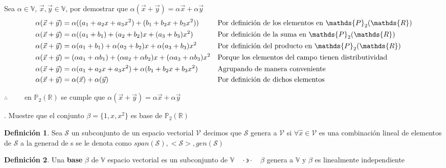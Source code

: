 \documentclass[letterpaper]{article}
\newcommand{\V}{\mathds{V}}
\newcommand{\tq}{ \quad \cdot  \backepsilon \cdot \quad }
\newcommand{\Po}{\mathds{P}_2(\mathds{R})}
\renewcommand{\*}{\cdot}
\theoremstyle{definition}
\newtheorem{definition}{Definición}
\begin{document}
Sea $ \alpha \in \V $, $ \vec{x}, \vec{y} \in \V $, por demostrar que $ \alpha(\vec{x} + \vec{y}) = \alpha\vec{x} + \alpha\vec{y}$
\begin{align*}
	\alpha(\vec{x} + \vec{y}) &= \alpha( (a_1 + a_2x + a_3x^2) + (b_1 + b_2x + b_3x^2) ) && \text{Por definición de los elementos en $ \Po $}\\
	\alpha(\vec{x} + \vec{y}) &= \alpha((a_1 + b_1) + (a_2 + b_2)x + (a_3 + b_3)x^2)&& \text{Por definición de la suma en $ \Po $}\\
	\alpha(\vec{x} + \vec{y}) &= \alpha(a_1 + b_1) + \alpha(a_2 + b_2)x + \alpha(a_3 + b_3)x^2&& \text{Por definición del producto en $ \Po $}\\
	\alpha(\vec{x} + \vec{y}) &= (\alpha a_1 + \alpha b_1) + (\alpha a_2 + \alpha b_2)x + (\alpha a_3 +\alpha b_3)x^2&& \text{Porque los elementos del campo tienen distributividad}\\
	\alpha(\vec{x} + \vec{y}) &= \alpha(a_1 + a_2x + a_3x^2) + \alpha(b_1 + b_2x + b_3x^2)&& \text{Agrupando de manera conveniente}\\
	\alpha(\vec{x} + \vec{y}) &= \alpha(\vec{x}) + \alpha(\vec{y})&& \text{Por definición de dichos elementos}\\
\end{align*}
\begin{center}
	$ \therefore \qquad $ en $ \Po $ se cumple que $ \alpha(\vec{x} + \vec{y}) = \alpha\vec{x} + \alpha\vec{y} $
\end{center}



. Muestre que el conjunto  $\beta =  \{ 1, x , x^2 \}$ es base de $ \mathbb{P}_{2}(\mathbb{R})$
\begin{definition}
	Sea $ \mathcal{S} $ un subconjunto de un espacio vectorial $ \mathcal{V} $ decimos que $ \mathcal{S} $ genera a $ \mathcal{V} $ si $ \forall \hat{x} \in \mathcal{V} $ es una combinación lineal de elementos de $ \mathcal{S} $ a la generad de s se le denota como $ span(\mathcal{S}), <\mathcal{S}>, gen(\mathcal{S})$ 
\end{definition}

\begin{definition}
	Una \textbf{base} $ \beta $ de $ \V $ espacio vectorial es un subconjunto de $ \V \tq \beta$  genera a $ \V $ y $ \beta $ es linealmente independiente
\end{definition}
\end{document}
